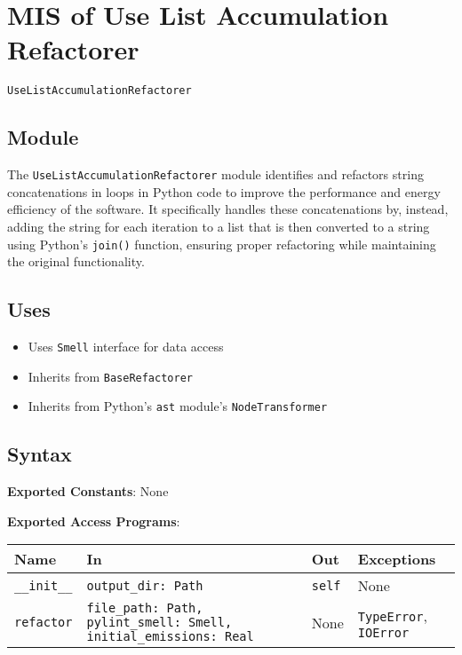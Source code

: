 \documentclass[12pt, titlepage]{article}
\begin{document}
\section{MIS of Use List Accumulation Refactorer} \label{mis:ListAccum}

\texttt{UseListAccumulationRefactorer}

\subsection{Module}

The \texttt{UseListAccumulationRefactorer} module identifies and refactors 
string concatenations in loops in Python code to improve the performance and energy efficiency of the software. It specifically handles these concatenations by, instead, adding the string for each iteration to a list that is then converted to a string using Python's \texttt{join()} function, ensuring proper refactoring while maintaining the original functionality.

\subsection{Uses}
\begin{itemize}
  \item Uses \texttt{Smell} interface for data access
  \item Inherits from \texttt{BaseRefactorer}
  \item Inherits from Python's \texttt{ast} module's \texttt{NodeTransformer}
\end{itemize}
  
\subsection{Syntax}
\noindent
\textbf{Exported Constants}: None

\noindent
\textbf{Exported Access Programs}:
  
\begin{tabularx}{\linewidth}{|
    l|
    >{\raggedright\arraybackslash}X|
    l|
    l|}
  \hline
  \textbf{Name} & \textbf{In} & \textbf{Out} & \textbf{Exceptions} \\
  \hline
  \texttt{\_\_init\_\_} & \texttt{output\_dir: Path} & \texttt{self} & None \\
  \hline
  \texttt{refactor} & \texttt{file\_path: Path, pylint\_smell: Smell, initial\_emissions: Real} & None & \texttt{TypeError}, \texttt{IOError} \\
  \hline
\end{tabularx}
  
\end{document}
